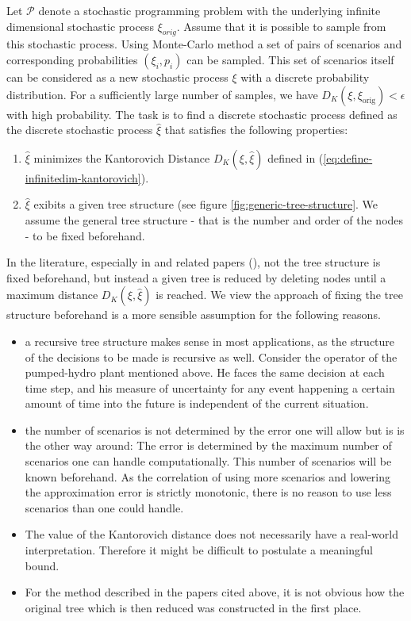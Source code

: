 \documentclass[a4paper, 12pt] {article}
\begin{document}
Let $\mathcal{P}$ denote a stochastic programming problem with the underlying infinite dimensional stochastic process $\xi_{orig}$.
Assume that it is possible to sample from this stochastic process.
Using Monte-Carlo method a set of pairs of scenarios and corresponding probabilities $(\xi_i,p_i)$ can be sampled.
This set of scenarios itself can be considered as a new stochastic process $\xi$ with a discrete probability distribution.
For a sufficiently large number of samples, we have $D_K(\xi,\xi_{\mathrm{orig}})<\epsilon$ with high probability.
The task is to find a discrete stochastic process defined as the discrete stochastic process $\hat{\xi}$ that satisfies the following properties:
\begin{enumerate}
\item $\hat{\xi}$ minimizes the Kantorovich Distance $D_K(\xi,\hat{\xi})$ defined in (\ref{eq:define-infinitedim-kantorovich}).
\item $\hat{\xi}$ exibits a given tree structure (see figure \ref{fig:generic-tree-structure}.  We assume the general tree structure - that is the number and order of the nodes - to be fixed beforehand. 
\end{enumerate}
In the literature, especially in \cite{Heitsch2009} and related papers (\cite{Dupacova2003,Heitsch2003,Heitsch2009a,Heitsch2010}), not the tree structure is fixed beforehand, but instead a given tree is reduced by deleting nodes until a maximum distance $D_K(\xi,\hat{\xi})$ is reached.
We view the approach of fixing the tree structure beforehand is a more sensible assumption for the following reasons.
\begin{itemize}
\item a recursive tree structure makes sense in most applications, as the structure of the decisions to be made is recursive as well. Consider the operator of the pumped-hydro plant mentioned above. He faces the same decision at each time step, and his measure of uncertainty for any event happening a certain amount of time into the future is independent of the current situation.
\item the number of scenarios is not determined by the error one will allow but is is the other way around: The error is determined by the maximum number of scenarios one can handle computationally. This number of scenarios will be known beforehand. As the correlation of using more scenarios and lowering the approximation error is strictly monotonic, there is no reason to use less scenarios than one could handle.
\item The value of the Kantorovich distance does not necessarily have a real-world interpretation. Therefore it might be difficult to postulate a meaningful bound.
\item For the method described in the papers cited above, it is not obvious how the original tree which is then reduced was constructed in the first place.
\end{itemize}
\end{document}
